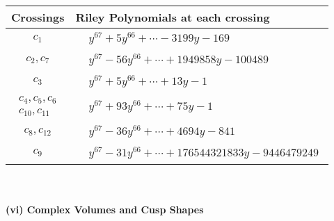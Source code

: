 \documentclass[1p]{elsarticle_modified}
\theoremstyle{definition}
\begin{document}
\begin{tabular}{m{50pt}|m{274pt}}
Crossings & \hspace{64pt}Riley Polynomials at each crossing \\
\hline $$\begin{aligned}c_{1}\end{aligned}$$&$\begin{aligned}
&y^{67}+5 y^{66}+\cdots-3199 y-169
\end{aligned}$\\
\hline $$\begin{aligned}c_{2},c_{7}\end{aligned}$$&$\begin{aligned}
&y^{67}-56 y^{66}+\cdots+1949858 y-100489
\end{aligned}$\\
\hline $$\begin{aligned}c_{3}\end{aligned}$$&$\begin{aligned}
&y^{67}+5 y^{66}+\cdots+13 y-1
\end{aligned}$\\
\hline $$\begin{aligned}c_{4},c_{5},c_{6}\\c_{10},c_{11}\end{aligned}$$&$\begin{aligned}
&y^{67}+93 y^{66}+\cdots+75 y-1
\end{aligned}$\\
\hline $$\begin{aligned}c_{8},c_{12}\end{aligned}$$&$\begin{aligned}
&y^{67}-36 y^{66}+\cdots+4694 y-841
\end{aligned}$\\
\hline $$\begin{aligned}c_{9}\end{aligned}$$&$\begin{aligned}
&y^{67}-31 y^{66}+\cdots+176544321833 y-9446479249
\end{aligned}$\\
\hline
\end{tabular}\\~\\
\newpage\flushleft \textbf{(vi) Complex Volumes and Cusp Shapes}
\end{document}
